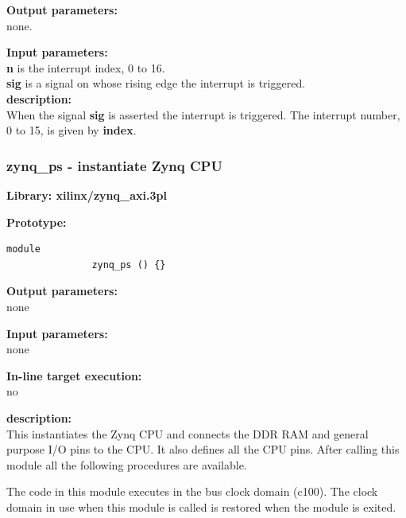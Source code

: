             {\bf Output parameters:} \\
            
                none.                       
            
            {\bf Input parameters:} \\
                        
                {\bf n} is the interrupt index, 0 to 16.\\
                {\bf sig} is a signal on whose rising edge the interrupt
                is triggered.\\
                       
            {\bf description:} \\
            When the signal {\bf sig} is asserted the interrupt is triggered.
            The interrupt number, 0 to 15, is given by {\bf index}.



    
        \subsubsection{zynq\_ps - instantiate Zynq CPU}\label{sec:lpzynqps}

            {\bf Library: xilinx/zynq\_axi.3pl}

            {\bf Prototype:} \\
            \vsp
            \begin{lstlisting}[gobble=12, language=threepl]
               module
               zynq_ps () {}
            \end{lstlisting}

            {\bf Output parameters:} \\
            none

            {\bf Input parameters:} \\            
            none
        
            {\bf In-line target execution:} \\
            no

            {\bf description:} \\            
            This instantiates the Zynq CPU and connects the DDR RAM and
            general purpose I/O pins to the CPU. It also defines all the
            CPU pins. After calling this module all the following
            procedures are available.

            The code in this module executes in the bus clock domain (c100).
            The clock domain in use when this module is called is restored when
            the module is exited.



